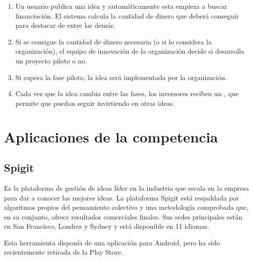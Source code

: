 \begin{enumerate}
	\item Un usuario publica una idea y automáticamente esta empieza a buscar financiación. El sistema calcula la cantidad de dinero que deberá conseguir para destacar de entre las demás.
	\item Si se consigue la cantidad de dinero necesaria (o si lo considera la organización), el equipo de
	innovación de la organización decide si desarrolla un proyecto piloto o no.
	\item Si supera la fase piloto, la idea será implementada por la organización.
	\item Cada vez que la idea cambia entre las fases, los inversores reciben un , que permite
	que puedan seguir invirtiendo en otras ideas.
\end{enumerate}


\section{Aplicaciones de la competencia}
\subsection{Spigit}

Es la plataforma de gestión de ideas líder en la industria que escala en la empresa para dar a conocer las mejores ideas. La plataforma Spigit está respaldada por algoritmos propios del pensamiento colectivo y una metodología comprobada que, en su conjunto, ofrece resultados comerciales finales. Sus sedes principales están en San Francisco, Londres y Sydney y está disponible en 11 idiomas.

Esta herramienta disponía de una aplicación para Android, pero ha sido recientemente retirada de la 
Play Store.

